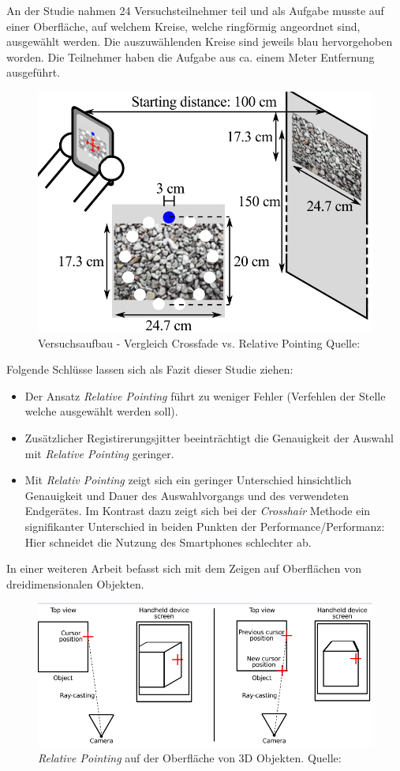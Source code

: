 An der Studie nahmen 24 Versuchsteilnehmer teil und als Aufgabe musste auf einer Oberfläche, auf welchem Kreise, welche ringförmig angeordnet sind, ausgewählt werden. Die auszuwählenden Kreise sind jeweils blau hervorgehoben worden. Die Teilnehmer haben die Aufgabe aus ca. einem Meter Entfernung ausgeführt.

\begin{figure}[H]
	\centering
	\includegraphics[width=.5\textwidth]{resources/analyse/versuchsaufbau.png}
	\caption{Versuchsaufbau - Vergleich Crossfade vs. Relative Pointing Quelle: \cite{Vincent2013}}
	\label{img:versuchsaufbau}
\end{figure}

Folgende Schlüsse lassen sich als Fazit dieser Studie ziehen:

\begin{itemize}
\item{Der Ansatz \textit{Relative Pointing} führt zu weniger Fehler (Verfehlen der Stelle welche ausgewählt werden soll).}
\item{Zusätzlicher Registirerungsjitter beeinträchtigt die Genauigkeit der Auswahl mit \textit{Relative Pointing} geringer.}
\item{Mit \textit{Relativ Pointing} zeigt sich ein geringer Unterschied hinsichtlich Genauigkeit und Dauer des Auswahlvorgangs und des verwendeten Endgerätes. Im Kontrast dazu zeigt sich bei der \textit{Crosshair} Methode ein signifikanter Unterschied in beiden Punkten der Performance/Performanz: Hier schneidet die Nutzung des Smartphones schlechter ab.}
\end{itemize}

In einer weiteren Arbeit befasst sich \citeauthor{Vincent2014} mit dem Zeigen auf Oberflächen von dreidimensionalen Objekten. \cite[S.~92]{Vincent2014}

\begin{figure}[H]
	\centering
	\includegraphics[width=.7\textwidth]{resources/analyse/pointing_3d.png}
	\caption{\textit{Relative Pointing} auf der Oberfläche von 3D Objekten. Quelle: \cite[S.~84]{Vincent2014}}
	\label{img:pointing_auf3d}
\end{figure}

